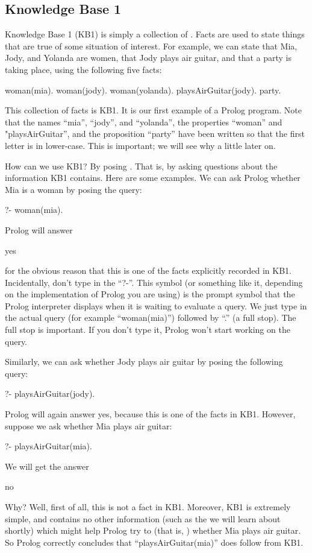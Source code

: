 \subsection*{Knowledge Base 1}\label{SUBSEC.L1.KB1}


Knowledge Base 1 (KB1) is simply a collection of .
Facts are used to state things that are  true
of some situation of interest.  For example, we can state that Mia,
Jody, and Yolanda are women, that Jody plays air guitar, and that a
party is taking place, using the following five facts:

\begin{LPNcodedisplay}
woman(mia).
woman(jody).
woman(yolanda).
playsAirGuitar(jody).
party.
\end{LPNcodedisplay}


This collection of facts is KB1. It is our first example of a Prolog program.
Note that the names ``mia'', ``jody'', and ``yolanda'', the properties ``woman'' and
"playsAirGuitar'', and the proposition ``party'' have been written so that the
first letter is in lower-case.  This is important; we will see why a little
later on.

How can we use KB1?  By posing . That is, by asking questions
about the information KB1 contains.  Here are some examples.  We can ask Prolog
whether Mia is a woman by posing the query:
\begin{LPNcodedisplay}
?- woman(mia).
\end{LPNcodedisplay}
Prolog will answer
\begin{LPNcodedisplay}
yes
\end{LPNcodedisplay}
for the obvious reason that this is one of the facts explicitly
recorded in KB1.  Incidentally,  don't type in the ``?-''.
This symbol (or something like it, depending on the implementation of
Prolog you are using) is the prompt symbol that the Prolog interpreter
displays when it is waiting to evaluate a query.  We just type in the
actual query (for example ``woman(mia)'') followed by ``.'' (a full stop).
The full stop is important. If you don't type it, Prolog won't start
working on the query.

Similarly, we can ask whether Jody plays air guitar by posing the
following query:

\begin{LPNcodedisplay}
?- playsAirGuitar(jody).
\end{LPNcodedisplay}
Prolog will again answer yes, because this is one of the facts in
KB1.  However, suppose we ask whether Mia plays air guitar:
\begin{LPNcodedisplay}
?- playsAirGuitar(mia).
\end{LPNcodedisplay}
We will get the answer
\begin{LPNcodedisplay}
no
\end{LPNcodedisplay}
Why? Well, first of all, this is not a fact in KB1. Moreover, KB1 is
extremely simple, and contains no other information (such as the
 we will learn about shortly) which might help Prolog
try to  (that is, ) whether Mia plays air
guitar. So Prolog correctly concludes that ``playsAirGuitar(mia)'' does
 follow from KB1.

